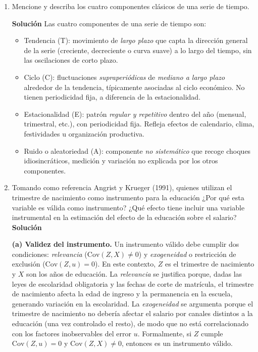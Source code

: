 \documentclass[10pt,a4paper]{article}
\begin{document}
\begin{enumerate}
\item Mencione y describa los cuatro componentes clásicos de una serie de tiempo.

\textbf{Solución}
Las cuatro componentes de una serie de tiempo son:
\begin{itemize}
    \item Tendencia (T): movimiento de \emph{largo plazo} que capta la dirección general de la serie
  (creciente, decreciente o curva suave) a lo largo del tiempo, sin las oscilaciones de corto plazo.
    \item Ciclo (C): fluctuaciones \emph{supraperiódicas} de \emph{mediano a largo plazo} alrededor de la tendencia,
  típicamente asociadas al ciclo económico. No tienen periodicidad fija, a diferencia de la estacionalidad.
  \item Estacionalidad (E): patrón \emph{regular y repetitivo} dentro del año (mensual, trimestral, etc.),
  con periodicidad fija. Refleja efectos de calendario, clima, festividades u organización productiva.
  \item Ruido o aleatoriedad (A):  componente \emph{no sistemático} que recoge choques idiosincráticos,
  medición y variación no explicada por los otros componentes.

\end{itemize}

\item Tomando como referencia Angrist y Krueger (1991), quienes utilizan el trimestre de nacimiento como instrumento para la educación ¿Por qué esta variable es válida como instrumento? ¿Qué efecto tiene incluir una variable instrumental en la estimación del efecto de la educación sobre el salario?
\\
\textbf{Solución}

\textbf{(a) Validez del instrumento.}
Un instrumento válido debe cumplir dos condiciones:
\emph{relevancia} (\(\mathrm{Cov}(Z,X)\neq0\)) y \emph{exogeneidad} o restricción de exclusión (\(\mathrm{Cov}(Z,u)=0\)). 
En este contexto, \(Z\) es el trimestre de nacimiento y \(X\) son los años de educación. 
La \emph{relevancia} se justifica porque, dadas las leyes de escolaridad obligatoria y las fechas de corte de matrícula, el trimestre de nacimiento afecta la edad de ingreso y la permanencia en la escuela, generando variación en la escolaridad. 
La \emph{exogeneidad} se argumenta porque el trimestre de nacimiento no debería afectar el salario por canales distintos a la educación (una vez controlado el resto), de modo que no está correlacionado con los factores inobservables del error \(u\). 
Formalmente, si \(Z\) cumple \(\mathrm{Cov}(Z,u)=0\) y \(\mathrm{Cov}(Z,X)\neq 0\), entonces es un instrumento válido. 
\\



\end{enumerate}
\end{document}
